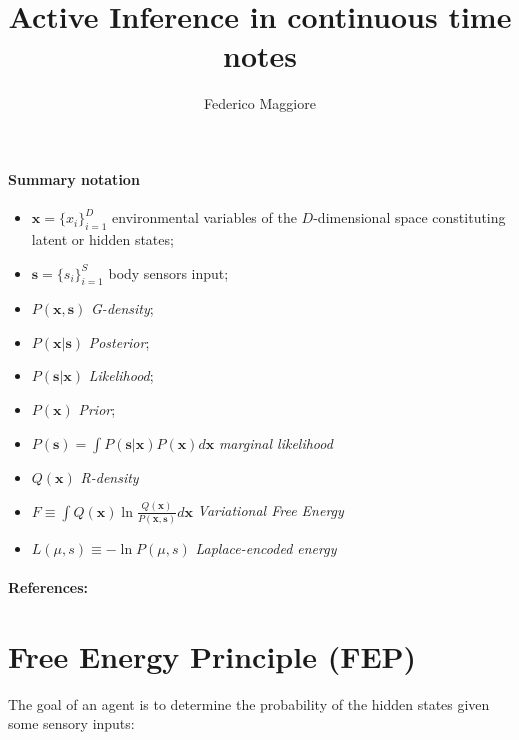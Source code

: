 \documentclass[a4paper, 10pt]{article}
\title{Active Inference in continuous time notes}
\author{Federico Maggiore}
\begin{document}

\maketitle

\paragraph{\textbf{Summary notation}}
\begin{itemize}

\item $\mathbf x = \lbrace{ x_i \rbrace}_{i=1}^{D}$ environmental variables of the $D$-dimensional space constituting latent or hidden states;

\item $\mathbf{s} = \lbrace{ s_i \rbrace}_{i=1}^{S}$ body sensors input;

\item $P(\mathbf{x},\mathbf{s})$ \emph{G-density};

\item $P(\mathbf{x}|\mathbf{s})$ \emph{Posterior}; 

\item $P(\mathbf{s}|\mathbf{x})$ \emph{Likelihood};

\item $P(\mathbf x)$ \emph{Prior};

\item $P(\mathbf s)=\int P(\mathbf s|\mathbf x)P(\mathbf x) d\mathbf x $ \emph{marginal likelihood}

\item $Q(\mathbf x)$ \emph{R-density}

\item $F \equiv \int Q(\mathbf x) \ln \frac{Q(\mathbf x)}{P(\mathbf x,\mathbf s)}d\mathbf x $ \emph{Variational Free Energy}

\item $L(\mu,s) \equiv - \ln P(\mu,s)$ \emph{Laplace-encoded energy}
\end{itemize}

\paragraph{\textbf{References:}} 
\cite{Baltieri2019} \cite{Buckley2017}




\section*{Free Energy Principle (FEP)}
The goal of an agent is to determine the probability of the hidden states given some sensory inputs:
\end{document}
